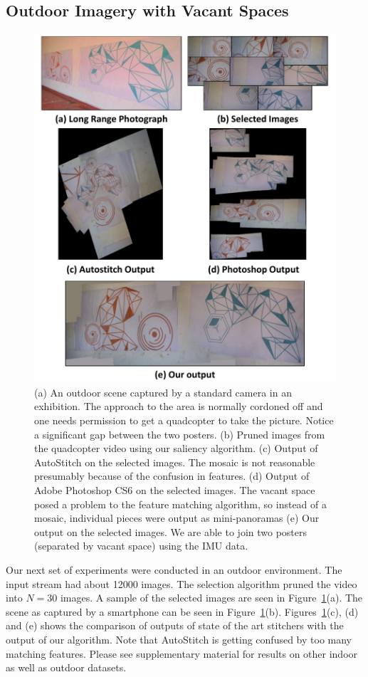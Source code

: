 \subsection{Outdoor Imagery with Vacant Spaces}

\begin{figure}[h!]
\centering
\includegraphics[width=0.86\linewidth]{figures/vacantSpaces/orange_blue}
\caption[Result: Outdoor Exhibition]{(a) An outdoor scene captured by a standard
camera in an exhibition. The approach to the area is normally cordoned off and one
  needs permission to get a quadcopter to take the picture.  Notice a
  significant gap between the two posters.  (b) Pruned images from the
  quadcopter video using our saliency algorithm. (c) Output of
  AutoStitch on the selected images. The mosaic is not reasonable
  presumably because of the confusion in features. (d) Output of Adobe
  Photoshop CS6 on the selected images. The vacant space posed a
  problem to the feature matching algorithm, so instead of a mosaic,
  individual pieces were output as mini-panoramas (e) Our output on
  the selected images. We are able to join two posters (separated by
  vacant space) using the IMU data.}
\label{fig:results}
\end{figure}

Our next set of experiments were conducted in an outdoor
environment. The input stream had about 12000 images. The selection
algorithm pruned the video into $N=30$ images. A sample of the
selected images are seen in Figure~\ref{fig:results}(a).  The scene as
captured by a smartphone can be seen in Figure~\ref{fig:results}(b).
Figures~\ref{fig:results}(c), (d) and (e) shows the comparison of outputs of
state of the art stitchers with the output of our algorithm. Note that
AutoStitch is getting confused by too many matching features. 
Please see supplementary material for results on other indoor as well as outdoor datasets.

